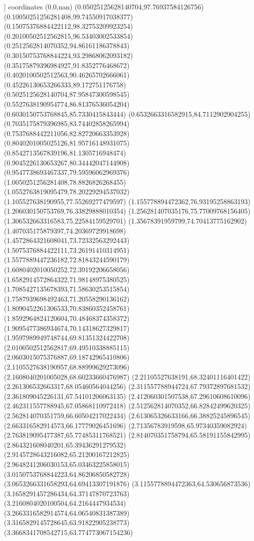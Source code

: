 ]
coordinates {%
(0.0,nan)
(0.05025125628140704,97.76937584126756)
(0.10050251256281408,99.74550917038377)
(0.15075376884422112,98.32753209923254)
(0.20100502512562815,96.53403002533854)
(0.2512562814070352,94.86161186378843)
(0.30150753768844224,93.29868062093182)
(0.35175879396984927,91.8352776468672)
(0.4020100502512563,90.46265702666061)
(0.45226130653266333,89.172751176758)
(0.5025125628140704,87.95847300598545)
(0.5527638190954774,86.81376536054204)
(0.6030150753768845,85.7330415843444)
(0.6532663316582915,84.7112902904255)
(0.7035175879396985,83.74402858265994)
(0.7537688442211056,82.82720663353928)
(0.8040201005025126,81.95716148931075)
(0.8542713567839196,81.1305716948474)
(0.9045226130653267,80.34442047144908)
(0.9547738693467337,79.59596062969376)
(1.0050251256281408,78.8826826268455)
(1.0552763819095479,78.20229294537032)
(1.105527638190955,77.55269277479597)
(1.155778894472362,76.93195258863193)
(1.206030150753769,76.33829888010354)
(1.256281407035176,75.77009768156405)
(1.306532663316583,75.22584159529701)
(1.35678391959799,74.70413775162902)
(1.407035175879397,74.20369729918698)
(1.4572864321608041,73.72332563292443)
(1.5075376884422111,73.26191410314951)
(1.5577889447236182,72.81843244590179)
(1.6080402010050252,72.39192206658056)
(1.6582914572864322,71.98148975380525)
(1.7085427135678393,71.58630253515854)
(1.7587939698492463,71.20558290136162)
(1.8090452261306533,70.83860352458761)
(1.8592964824120604,70.48468374358372)
(1.9095477386934674,70.14318627329817)
(1.9597989949748744,69.81351324422708)
(2.0100502512562817,69.49510338885115)
(2.0603015075376887,69.18742965410806)
(2.1105527638190957,68.88999629273096)
(2.1608040201005028,68.60233660476987)
(2.21105527638191,68.32401116401422)
(2.261306532663317,68.05460564044256)
(2.311557788944724,67.79372897681532)
(2.361809045226131,67.54101206063135)
(2.412060301507538,67.29610608610096)
(2.462311557788945,67.05868110972418)
(2.512562814070352,66.82842499620325)
(2.562814070351759,66.60504217022434)
(2.613065326633166,66.38825245896545)
(2.663316582914573,66.17779026451696)
(2.71356783919598,65.97340359082924)
(2.763819095477387,65.77485311768521)
(2.814070351758794,65.58191155842995)
(2.864321608040201,65.39436291279532)
(2.9145728643216082,65.21200167212825)
(2.9648241206030153,65.03463225858015)
(3.0150753768844223,64.86206850582728)
(3.0653266331658293,64.69413307191876)
(3.1155778894472363,64.530656873536)
(3.1658291457286434,64.37147870723763)
(3.2160804020100504,64.2164447934534)
(3.2663316582914574,64.06540831387389)
(3.3165829145728645,63.91822905238773)
(3.3668341708542715,63.774773067154236)
}

